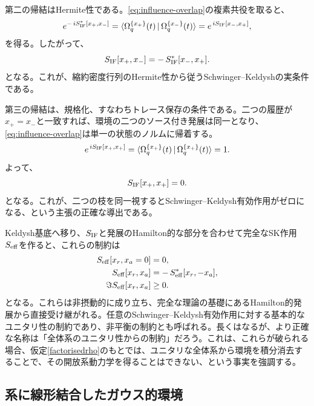 \documentclass[a4paper,11pt,oneside]{article}
\theoremstyle{definition}
\numberwithin{equation}{section}
\begin{document}
第二の帰結はHermite性である。\eqref{eq:influence-overlap}の複素共役を取ると、
\begin{equation}
e^{-\,iS_{\rm IF}^*[x_+,x_-]}
=
\langle \Omega_q^{\{x_+\}}(t)\,|\,\Omega_q^{\{x_-\}}(t)\rangle
=
e^{\,iS_{\rm IF}[x_-,x_+]} ,
\end{equation}
を得る。したがって、
\begin{equation}
S_{\rm IF}[x_+,x_-]
=
-\,S_{\rm IF}^*[x_-,x_+] .
\end{equation}
となる。これが、縮約密度行列のHermite性から従うSchwinger--Keldyshの実条件である。



第三の帰結は、規格化、すなわちトレース保存の条件である。二つの履歴が\(x_+=x_-\)と一致すれば、環境の二つのソース付き発展は同一となり、\eqref{eq:influence-overlap}は単一の状態のノルムに帰着する。
\begin{equation}
e^{\,iS_{\rm IF}[x_+,x_+]}
=
\langle \Omega_q^{\{x_+\}}(t)\,|\,\Omega_q^{\{x_+\}}(t)\rangle
=
1 .
\end{equation}
よって、
\begin{equation}
S_{\rm IF}[x_+,x_+] = 0 .
\end{equation}
となる。これが、二つの枝を同一視するとSchwinger--Keldysh有効作用がゼロになる、という主張の正確な導出である。



Keldysh基底へ移り、$  S_{\rm IF} $と発展のHamilton的な部分を合わせて完全なSK作用$  S_{\rm eff} $を作ると、これらの制約は
\begin{align}\label{constraintsra}
S_{\rm eff}[x_r,x_a=0] &= 0 ,\\
S_{\rm eff}[x_r,x_a] &= -\,S_{\rm eff}^*[x_r,-x_a] ,\\
\Im S_{\rm eff}[x_r,x_a] &\ge 0 .
\end{align}
となる。これらは非摂動的に成り立ち、完全な理論の基礎にあるHamilton的発展から直接受け継がれる。任意のSchwinger--Keldysh有効作用に対する基本的なユニタリ性の制約であり、非平衡の制約とも呼ばれる。長くはなるが、より正確な名称は「全体系のユニタリ性からの制約」だろう。これは、これらが破られる場合、仮定\eqref{factorisedrho}のもとでは、ユニタリな全体系から環境を積分消去することで、その開放系動力学を得ることはできない、という事実を強調する。






\subsection{系に線形結合したガウス的環境}\label{sec:4p7}
\end{document}
